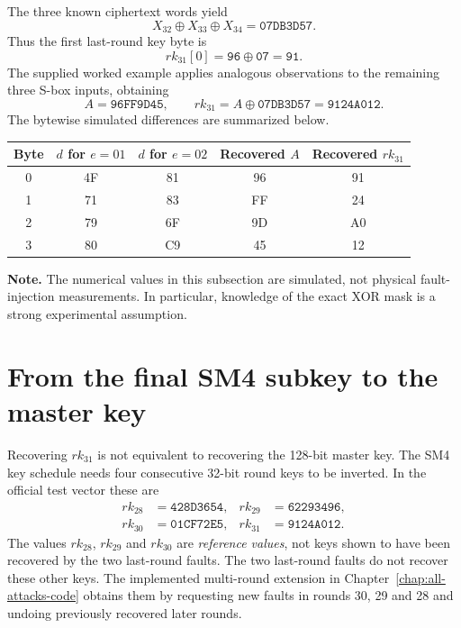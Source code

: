 \documentclass[11pt,a4paper]{report}
\newcommand{\hex}[1]{\texttt{#1}}
\newcommand{\xor}{\mathbin{\oplus}}
\newcommand{\note}[1]{\par\smallskip\noindent\colorbox{pale}{\parbox{0.94\linewidth}{\textbf{Note.} #1}}\par\smallskip}
\begin{document}
The three known ciphertext words yield
\begin{equation}
X_{32}\xor X_{33}\xor X_{34}=\hex{07DB3D57}.
\end{equation}
Thus the first last-round key byte is
\begin{equation}
rk_{31}[0]=\hex{96}\xor\hex{07}=\boxed{\hex{91}}.
\end{equation}
The supplied worked example applies analogous observations to the remaining three S-box inputs, obtaining
\begin{equation}
A=\hex{96FF9D45},\qquad rk_{31}=A\xor\hex{07DB3D57}=\boxed{\hex{9124A012}}.
\end{equation}
The bytewise simulated differences are summarized below.
\begin{center}
\begin{tabular}{ccccc}\toprule
Byte&$d$ for $e=01$&$d$ for $e=02$&Recovered $A$&Recovered $rk_{31}$\\\midrule
0&4F&81&96&91\\
1&71&83&FF&24\\
2&79&6F&9D&A0\\
3&80&C9&45&12\\\bottomrule
\end{tabular}
\end{center}
\note{The numerical values in this subsection are simulated, not physical fault-injection measurements. In particular, knowledge of the exact XOR mask is a strong experimental assumption.}

\section{From the final SM4 subkey to the master key}
Recovering $rk_{31}$ is not equivalent to recovering the 128-bit master key. The SM4 key schedule needs four consecutive 32-bit round keys to be inverted. In the official test vector these are
\begin{align*}
rk_{28}&=\hex{428D3654},&rk_{29}&=\hex{62293496},\\
rk_{30}&=\hex{01CF72E5},&rk_{31}&=\hex{9124A012}.
\end{align*}
The values $rk_{28}$, $rk_{29}$ and $rk_{30}$ are \emph{reference values}, not keys shown to have been recovered by the two last-round faults. The two last-round faults do not recover these other keys. The implemented multi-round extension in Chapter~\ref{chap:all-attacks-code} obtains them by requesting new faults in rounds 30, 29 and 28 and undoing previously recovered later rounds.
\end{document}
